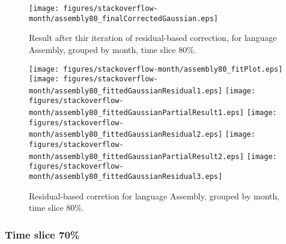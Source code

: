 \begin{figure}[]
\centering
{\texttt{[image: figures/stackoverflow-month/assembly80\_finalCorrectedGaussian.eps]}}
\caption{Result after thir iteration of residual-based correction, for language Assembly, grouped by month, time slice 80\%.}
\end{figure}


\begin{figure}[hb]
\centering
{}
{\texttt{[image: figures/stackoverflow-month/assembly80\_fitPlot.eps]}}
{\texttt{[image: figures/stackoverflow-month/assembly80\_fittedGaussianResidual1.eps]}}
{\texttt{[image: figures/stackoverflow-month/assembly80\_fittedGaussianPartialResult1.eps]}}
{\texttt{[image: figures/stackoverflow-month/assembly80\_fittedGaussianResidual2.eps]}}
{\texttt{[image: figures/stackoverflow-month/assembly80\_fittedGaussianPartialResult2.eps]}}
{\texttt{[image: figures/stackoverflow-month/assembly80\_fittedGaussianResidual3.eps]}}
\caption{Residual-based corretion for language Assembly, grouped by month, time slice 80\%.}
\end{figure}


\clearpage 
\newpage 


\FloatBarrier

\subsubsection{Time slice 70\%}

